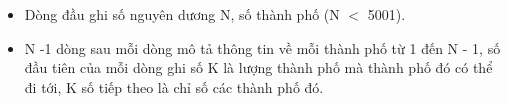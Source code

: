 \begin{itemize}
	\item     Dòng đầu ghi số nguyên dương N, số thành phố (N $<$ 5001).   
	\item     N -1 dòng sau mỗi dòng mô tả thông tin về mỗi thành phố từ 1 đến N - 1, số đầu tiên của mỗi dòng ghi số K là lượng thành phố mà thành phố đó có thể đi tới, K số tiếp theo là chỉ số các thành phố đó.   
\end{itemize}

\